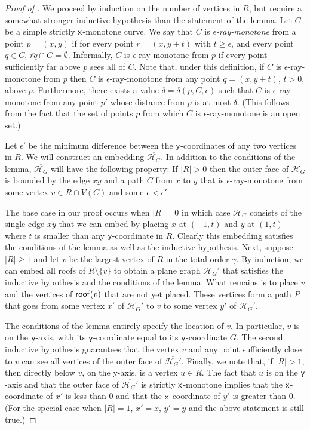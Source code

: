 \documentclass[lotsofwhite,charterfonts, letter]{patmorin}
\newcommand{\x}{\ensuremath{\protect\textup{\textsf{x}}}}
\newcommand{\y}{\ensuremath{\protect\textup{\textsf{y}}}}
\newcommand{\hg}{\ensuremath{\mathcal{H}_G}}
\newcommand{\rf}[1]{\ensuremath{\textup{\textsf{roof}}(#1)}}
\begin{document}



\begin{proof}[Proof of ]

We proceed by induction on the number of vertices in $R$, but require
a somewhat stronger inductive hypothesis than the statement of the
lemma.  Let $C$ be a simple strictly \x-monotone curve.  We say that $C$ is
\emph{$\epsilon$-ray-monotone} from a point $p=(x,y)$ if for every
point $r=(x,y+t)$ with $t\ge\epsilon$, and every point $q\in C$,
$\overline{rq}\cap C=\emptyset$.  Informally, $C$ is
$\epsilon$-ray-monotone from $p$ if every point sufficiently far above
$p$ sees all of $C$. 
Note that, under this definition, if $C$ is $\epsilon$-ray-monotone
from $p$ then $C$ is $\epsilon$-ray-monotone from any point
$q=(x,y+t)$, $t>0$, above $p$.  Furthermore, there exists a value
$\delta=\delta(p,C,\epsilon)$ such that $C$ is
$\epsilon$-ray-monotone from any point $p'$ whose distance
from $p$ is at most $\delta$.  (This follows from the fact that the
set of points $p$ from which $C$ is $\epsilon$-ray-monotone is an open
set.)

Let $\epsilon'$ be the minimum difference between the \y-coordinates of
any two vertices in $R$.  We will construct an embedding
$\overline{\hg}$. In addition to the conditions of the lemma,
$\overline{\hg}$ will have the following property:
If $|R|>0$ then the outer face of $\hg$ is bounded by the edge
$xy$ and a path $C$ from $x$ to $y$ that is $\epsilon$-ray-monotone from
some vertex $v\in R\cap V(C)$ and some $\epsilon < \epsilon'$.

The base case in our proof occurs when $|R|=0$ in which case $\hg$
consists of the single edge $xy$ that we can embed by placing $x$ at
$(-1,t)$ and $y$ at $(1,t)$ where $t$ is smaller than any \y-coordinate
in $R$.  Clearly this embedding satisfies the conditions of the lemma
as well as the inductive hypothesis.  Next, suppose $|R|\ge 1$ and let
$v$ be the largest vertex of $R$ in the total order $\gamma$. By induction, we can embed all roofs of $R\setminus \{v\}$ to
obtain a plane graph $\overline{\hg'}$ that satisfies the inductive
hypothesis and the conditions of the lemma.  What remains is to place
$v$ and the vertices of $\rf{v}$ that are not yet placed. These
vertices form a path $P$ that goes from some vertex $x'$ of $\hg'$ to
$v$ to some vertex $y'$ of $\hg'$. 

The conditions of the lemma entirely specify the location of $v$. In
particular, $v$ is on the \y-axis, with its \y-coordinate equal to its
\y-coordinate $G$.
The second inductive hypothesis guarantees that the vertex $v$ and any
point sufficiently close to $v$ can see all vertices of the
outer face of $\overline{\hg'}$.  Finally, we note that, if $|R|>1$,
then directly
below $v$, on the y-axis, is a vertex $u\in R$. The fact that $u$ is
on the \y-axis and that the outer face of $\overline{\hg'}$ is
strictly \x-monotone implies that the \x-coordinate of $x'$ is less than 0 and
that the \x-coordinate of $y'$ is greater than 0.  (For the special
case when  $|R|=1$,
$x'=x$, $y'=y$ and the above statement is still true.)


\end{proof}
\end{document}
